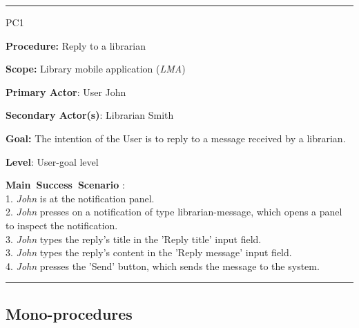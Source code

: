 \vspace{0.5cm}
\hrule
\begin{lyxlist}{PC1}
\small{
\item [\textbf{Procedure:}] Reply to a librarian
\item [\textbf{Scope:}] Library mobile application (\emph{LMA})
\item [\textbf{Primary Actor}:] User John
\item [\textbf{Secondary Actor(s)}:] Librarian Smith
\item [\textbf{Goal:}] The intention of the User is to reply to a message
received by a librarian.
\item [\textbf{Level}:] User-goal level
\item [\textbf{Main~Success~Scenario}]:\\
1. \emph{John} is at the notification panel.\\
2. \emph{John} presses on a notification of type librarian-message, which
opens a panel to inspect the notification. \\
3. \emph{John} types the reply's title in the 'Reply title' input field. \\
3. \emph{John} types the reply's content in the 'Reply message' input field. \\
4. \emph{John} presses the 'Send' button, which sends the message to the system.

}

\end{lyxlist}
\hrule





\subsection{Mono-procedures}

